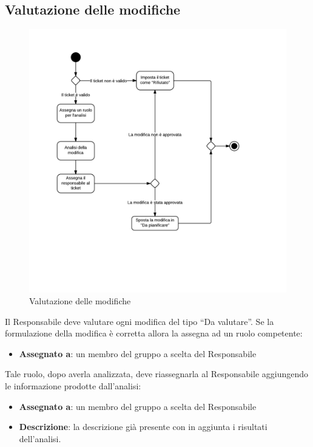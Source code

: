 \subsection{Valutazione delle modifiche}

\begin{figure}[H]
    \centering
    \includegraphics[width=1.2\textwidth]{uml-processi/Valutazione_delle_modifiche.png}
    \caption{Valutazione delle modifiche}
\end{figure}

Il Responsabile deve valutare ogni modifica del tipo ``Da valutare''. Se la formulazione della modifica è corretta allora la assegna ad un ruolo competente:
\begin{itemize}
 \item \textbf{Assegnato a}: un membro del gruppo a scelta del Responsabile
\end{itemize}

Tale ruolo, dopo averla analizzata, deve riassegnarla al Responsabile aggiungendo le informazione prodotte dall'analisi:
\begin{itemize}
 \item \textbf{Assegnato a}: un membro del gruppo a scelta del Responsabile
 \item \textbf{Descrizione}: la descrizione già presente con in aggiunta i risultati dell'analisi.
\end{itemize}

